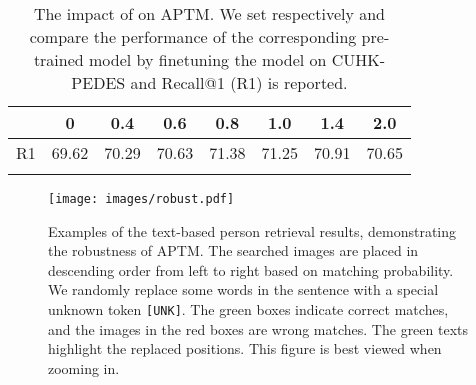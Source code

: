 \documentclass[sigconf]{acmart}
\begin{document}
\begin{table}[bp]
\small
\begin{center}
{
\setlength{\tabcolsep}{7pt}
\begin{tabular}{l|ccccccc}
\shline
 & 0     & 0.4   & 0.6   & 0.8   & 1.0   & 1.4   & 2.0  \\
\hline
R1      & 69.62 & 70.29 & 70.63 & 71.38 & 71.25 & 70.91 & 70.65 \\
\shline
\end{tabular}}
\end{center}
\caption{ The impact of  on APTM. We set  respectively and compare the performance of the corresponding pre-trained model by finetuning the model on CUHK-PEDES and Recall@1 (R1) is reported.
}
\label{table:beta}
\end{table}


\begin{figure}[bp]
\begin{center}
   \texttt{[image: images/robust.pdf]}
\end{center}
\vspace{-.1in}
   \caption{Examples of the text-based person retrieval results, demonstrating the robustness of APTM. The searched images are placed in descending order from left to right based on matching probability. We randomly replace some words in the sentence with a special unknown token \texttt{[UNK]}. The green boxes indicate correct matches, and the images in the red boxes are wrong matches. The green texts highlight the replaced positions. This figure is best viewed when zooming in.}
\label{fig:roubustness}
\end{figure}
\end{document}
